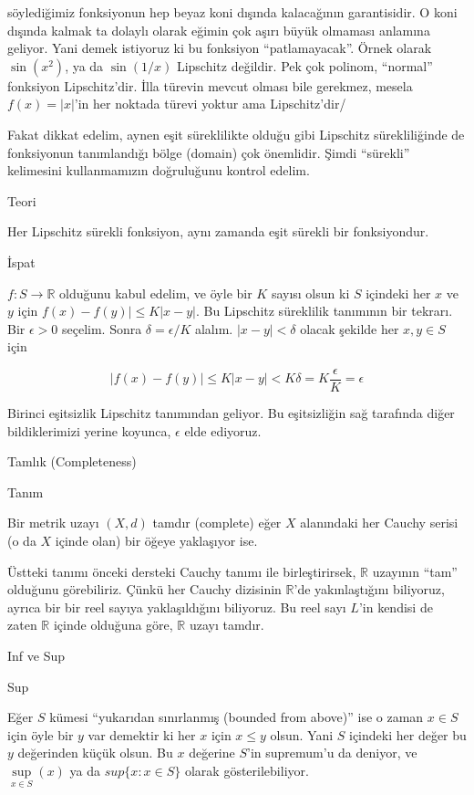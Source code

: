 \documentclass[12pt,fleqn]{article}\usepackage{../../common}
\begin{document}
söylediğimiz fonksiyonun hep beyaz koni dışında kalacağının
garantisidir. O koni dışında kalmak ta dolaylı olarak eğimin çok aşırı
büyük olmaması anlamına geliyor. Yani demek istiyoruz ki bu fonksiyon
``patlamayacak''. Örnek olarak $\sin(x^2)$, ya da $\sin(1/x)$ Lipschitz
değildir. Pek çok polinom, ``normal'' fonksiyon Lipschitz'dir. İlla türevin
mevcut olması bile gerekmez, mesela $f(x) = |x|$'in her noktada türevi
yoktur ama Lipschitz'dir/ 

Fakat dikkat edelim, aynen eşit süreklilikte olduğu gibi Lipschitz
sürekliliğinde de fonksiyonun tanımlandığı bölge (domain) çok
önemlidir. Şimdi ``sürekli'' kelimesini kullanmamızın doğruluğunu kontrol
edelim.

Teori 

Her Lipschitz sürekli fonksiyon, aynı zamanda eşit sürekli bir fonksiyondur.

İspat

$f: S \to \mathbb{R}$ olduğunu kabul edelim, ve öyle bir $K$ sayısı olsun ki $S$
içindeki her $x$ ve $y$ için $f(x) - f(y)| \le K|x-y|$. Bu Lipschitz süreklilik
tanımının bir tekrarı. Bir $\epsilon > 0$ seçelim. Sonra $\delta = \epsilon / K$
alalım.  $|x-y| < \delta$ olacak şekilde her $x,y \in S$ için

$$ |f(x) - f(y)| \le K|x-y| < K\delta = K \frac{ \epsilon}{K} = \epsilon $$

Birinci eşitsizlik Lipschitz tanımından geliyor. Bu eşitsizliğin sağ tarafında
diğer bildiklerimizi yerine koyunca, $\epsilon$ elde ediyoruz.

Tamlık (Completeness) 

Tanım

Bir metrik uzayı $(X,d)$ tamdır (complete) eğer $X$ alanındaki her Cauchy serisi
(o da $X$ içinde olan) bir öğeye yaklaşıyor ise.

Üstteki tanımı önceki dersteki Cauchy tanımı ile birleştirirsek, $\mathbb{R}$
uzayının ``tam'' olduğunu görebiliriz. Çünkü her Cauchy dizisinin
$\mathbb{R}$'de yakınlaştığını biliyoruz, ayrıca bir bir reel sayıya
yaklaşıldığını biliyoruz. Bu reel sayı $L$'in kendisi de zaten $\mathbb{R}$
içinde olduğuna göre, $\mathbb{R}$ uzayı tamdır.

Inf ve Sup

Sup

Eğer $S$ kümesi ``yukarıdan sınırlanmış (bounded from above)'' ise o zaman $x
\in S$ için öyle bir $y$ var demektir ki her $x$ için $x \le y$ olsun. Yani $S$
içindeki her değer bu $y$ değerinden küçük olsun. Bu $x$ değerine $S$'in
supremum'u da deniyor, ve $\sup\limits_{x \in S}(x)$ ya da $sup\{x:x \in S\}$
olarak gösterilebiliyor.
\end{document}
